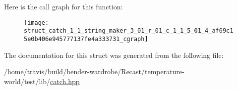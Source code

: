 Here is the call graph for this function\-:
\nopagebreak
\begin{figure}[H]
\begin{center}
\leavevmode
\texttt{[image: struct\_catch\_1\_1\_string\_maker\_3\_01\_r\_01\_c\_1\_1\_5\_01\_4\_af69c15e0b406e945777137fe4a333731\_cgraph]}
\end{center}
\end{figure}




The documentation for this struct was generated from the following file\-:\begin{DoxyCompactItemize}
\item 
/home/travis/build/bender-\/wardrobe/\-Recast/temperature-\/world/test/lib/\hyperlink{catch_8hpp}{catch.\-hpp}\end{DoxyCompactItemize}
